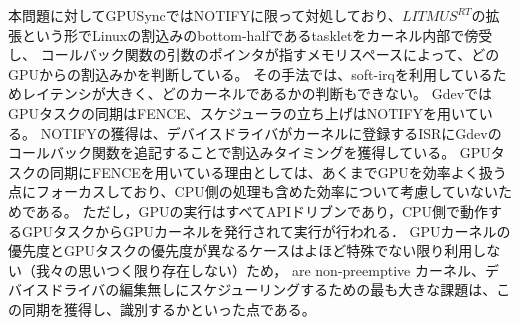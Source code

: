 本問題に対してGPUSyncではNOTIFYに限って対処しており、$LITMUS^{RT}$の拡張という形でLinuxの割込みのbottom-halfであるtaskletをカーネル内部で傍受し、
コールバック関数の引数のポインタが指すメモリスペースによって、どのGPUからの割込みかを判断している。
その手法では、soft-irqを利用しているためレイテンシが大きく、どのカーネルであるかの判断もできない。
GdevではGPUタスクの同期はFENCE、スケジューラの立ち上げはNOTIFYを用いている。
NOTIFYの獲得は、デバイスドライバがカーネルに登録するISRにGdevのコールバック関数を追記することで割込みタイミングを獲得している。
GPUタスクの同期にFENCEを用いている理由としては、あくまでGPUを効率よく扱う点にフォーカスしており、CPU側の処理も含めた効率について考慮していないためである。
ただし，GPUの実行はすべてAPIドリブンであり，CPU側で動作するGPUタスクからGPUカーネルを発行されて実行が行われる．
GPUカーネルの優先度とGPUタスクの優先度が異なるケースはよほど特殊でない限り利用しない（我々の思いつく限り存在しない）ため，
are non-preemptive
カーネル、デバイスドライバの編集無しにスケジューリングするための最も大きな課題は、この同期を獲得し、識別するかといった点である。
\fi


